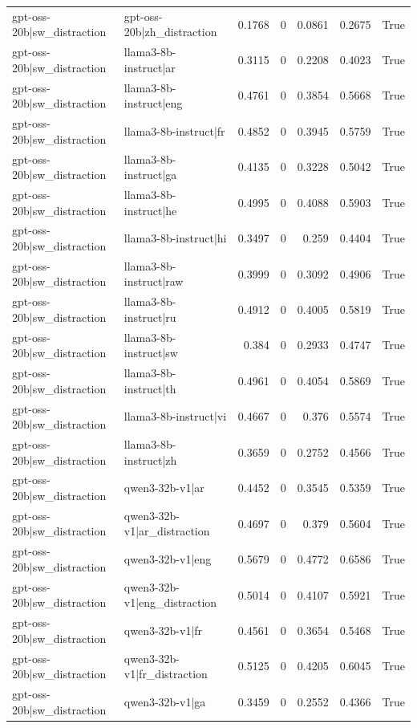 \begin{table}
\begin{tabular}{l l r r r r l}
gpt-oss-20b|sw_distraction & gpt-oss-20b|zh_distraction & 0.1768 & 0 & 0.0861 & 0.2675 & True \\
gpt-oss-20b|sw_distraction & llama3-8b-instruct|ar & 0.3115 & 0 & 0.2208 & 0.4023 & True \\
gpt-oss-20b|sw_distraction & llama3-8b-instruct|eng & 0.4761 & 0 & 0.3854 & 0.5668 & True \\
gpt-oss-20b|sw_distraction & llama3-8b-instruct|fr & 0.4852 & 0 & 0.3945 & 0.5759 & True \\
gpt-oss-20b|sw_distraction & llama3-8b-instruct|ga & 0.4135 & 0 & 0.3228 & 0.5042 & True \\
gpt-oss-20b|sw_distraction & llama3-8b-instruct|he & 0.4995 & 0 & 0.4088 & 0.5903 & True \\
gpt-oss-20b|sw_distraction & llama3-8b-instruct|hi & 0.3497 & 0 & 0.259 & 0.4404 & True \\
gpt-oss-20b|sw_distraction & llama3-8b-instruct|raw & 0.3999 & 0 & 0.3092 & 0.4906 & True \\
gpt-oss-20b|sw_distraction & llama3-8b-instruct|ru & 0.4912 & 0 & 0.4005 & 0.5819 & True \\
gpt-oss-20b|sw_distraction & llama3-8b-instruct|sw & 0.384 & 0 & 0.2933 & 0.4747 & True \\
gpt-oss-20b|sw_distraction & llama3-8b-instruct|th & 0.4961 & 0 & 0.4054 & 0.5869 & True \\
gpt-oss-20b|sw_distraction & llama3-8b-instruct|vi & 0.4667 & 0 & 0.376 & 0.5574 & True \\
gpt-oss-20b|sw_distraction & llama3-8b-instruct|zh & 0.3659 & 0 & 0.2752 & 0.4566 & True \\
gpt-oss-20b|sw_distraction & qwen3-32b-v1|ar & 0.4452 & 0 & 0.3545 & 0.5359 & True \\
gpt-oss-20b|sw_distraction & qwen3-32b-v1|ar_distraction & 0.4697 & 0 & 0.379 & 0.5604 & True \\
gpt-oss-20b|sw_distraction & qwen3-32b-v1|eng & 0.5679 & 0 & 0.4772 & 0.6586 & True \\
gpt-oss-20b|sw_distraction & qwen3-32b-v1|eng_distraction & 0.5014 & 0 & 0.4107 & 0.5921 & True \\
gpt-oss-20b|sw_distraction & qwen3-32b-v1|fr & 0.4561 & 0 & 0.3654 & 0.5468 & True \\
gpt-oss-20b|sw_distraction & qwen3-32b-v1|fr_distraction & 0.5125 & 0 & 0.4205 & 0.6045 & True \\
gpt-oss-20b|sw_distraction & qwen3-32b-v1|ga & 0.3459 & 0 & 0.2552 & 0.4366 & True \\

\end{tabular}
\end{table}
